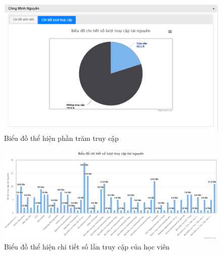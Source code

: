 \begin{itemize}
	\begin{center}
		\begin{figure}[htp]
			\begin{center}
				\includegraphics[width=0.8\linewidth]{img/41}
			\end{center}
			\caption{Biểu đồ thể hiện phần trăm truy cập}
			\label{refhinh74}
		\end{figure}
	\end{center}

	\begin{center}
		\begin{figure}[htp]
			\begin{center}
				\includegraphics[width=1\linewidth]{img/50}
			\end{center}
			\caption{Biểu đồ thể hiện chi tiết số lần truy cập của học viên}
			\label{refhinh88}
		\end{figure}
	\end{center}


\end{itemize}
